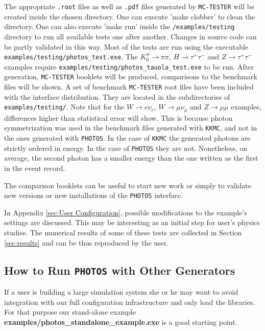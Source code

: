 \documentclass[]{Photos_interface_design}
\begin{document}
The appropriate {\tt .root} files as well as {\tt .pdf} files generated by {\tt MC-TESTER}
will be created inside the chosen directory. One can execute 'make clobber' to
clean the directory. One can also execute 'make run' inside the {\tt /examples/testing}
directory to run all available tests one after another. Changes in source
code  can  be partly validated in this way.
Most of the tests are run using the executable {\tt examples/testing/photos\_test.exe}. The 
 $K_{0}^{S} \rightarrow \pi \pi$, $H \rightarrow \tau^+ \tau^-$ and $Z \rightarrow \tau^+ \tau^-$ examples 
require
{\tt examples/testing/photos\_tauola\_test.exe} to be run.
After generation, {\tt MC-TESTER} booklets will be produced,
 comparisons to the benchmark files will be shown.
A set of benchmark {\tt MC-TESTER} root files have been included with the interface
distribution. They are located in the subdirectories of {\tt examples/testing/}.
Note that for the $W \rightarrow e \nu_e$, 
$W \rightarrow \mu \nu_\mu$ and $Z \rightarrow \mu \mu$
examples,   differences higher than statistical error will show. 
This is because  photon symmetrization
was used in the benchmark files generated with {\tt KKMC}, and not in the ones 
generated with {\tt PHOTOS}.
In the case of {\tt KKMC} the generated photons are strictly ordered in energy. 
In the case of {\tt PHOTOS} they are not. Nonetheless, on average, 
the second photon has a smaller energy than the one written as the first
in the event record.


The comparison booklets can be useful 
to start new work or simply to 
validate new versions or new installations of the {\tt PHOTOS} interface.

In Appendix \ref{sec:User Configuration}, possible modifications to the  
example's settings are discussed. This may be interesting as an initial step for user's 
physics studies.  The numerical results of some of these tests are collected in Section \ref{sec:results}
and can be thus reproduced by the user.

\subsection{How to Run {\tt PHOTOS} with Other Generators}
If a user is building a large simulation system she or he may want to avoid
integration with our full configuration infrastructure and only load the libraries. 
For that purpose our stand-alone 
example {\bf examples/photos\_standalone\_example.exe} is a good starting point.
\end{document}
